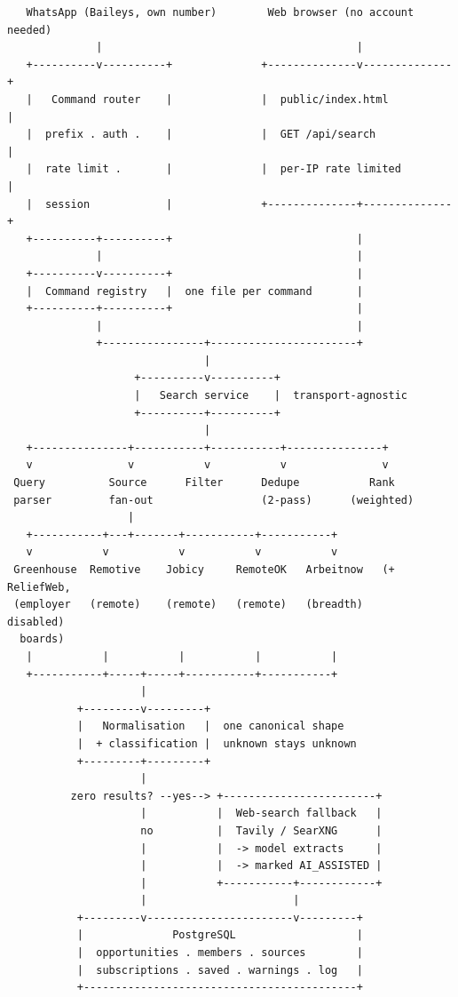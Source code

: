 \documentclass[11pt,a4paper]{report}
\begin{document}
\begin{lstlisting}
   WhatsApp (Baileys, own number)        Web browser (no account needed)
              |                                        |
   +----------v----------+              +--------------v--------------+
   |   Command router    |              |  public/index.html          |
   |  prefix . auth .    |              |  GET /api/search            |
   |  rate limit .       |              |  per-IP rate limited        |
   |  session            |              +--------------+--------------+
   +----------+----------+                             |
              |                                        |
   +----------v----------+                             |
   |  Command registry   |  one file per command       |
   +----------+----------+                             |
              |                                        |
              +----------------+-----------------------+
                               |
                    +----------v----------+
                    |   Search service    |  transport-agnostic
                    +----------+----------+
                               |
   +---------------+-----------+-----------+---------------+
   v               v           v           v               v
 Query          Source      Filter      Dedupe           Rank
 parser         fan-out                 (2-pass)      (weighted)
                   |
   +-----------+---+-------+-----------+-----------+
   v           v           v           v           v
 Greenhouse  Remotive    Jobicy     RemoteOK   Arbeitnow   (+ ReliefWeb,
 (employer   (remote)    (remote)   (remote)   (breadth)      disabled)
  boards)
   |           |           |           |           |
   +-----------+-----+-----+-----------+-----------+
                     |
           +---------v---------+
           |   Normalisation   |  one canonical shape
           |  + classification |  unknown stays unknown
           +---------+---------+
                     |
          zero results? --yes--> +------------------------+
                     |           |  Web-search fallback   |
                     no          |  Tavily / SearXNG      |
                     |           |  -> model extracts     |
                     |           |  -> marked AI_ASSISTED |
                     |           +-----------+------------+
                     |                       |
           +---------v-----------------------v---------+
           |              PostgreSQL                   |
           |  opportunities . members . sources        |
           |  subscriptions . saved . warnings . log   |
           +-------------------------------------------+
\end{lstlisting}
\end{document}
